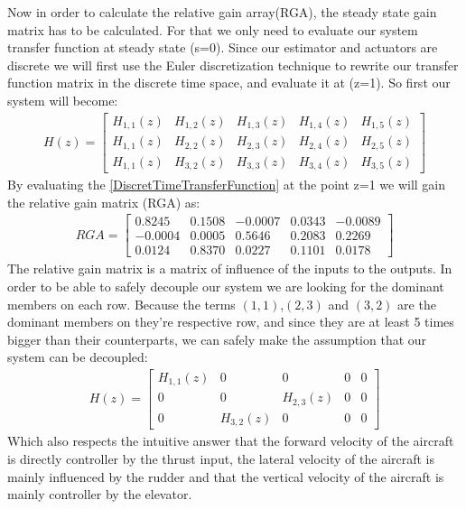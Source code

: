 \documentclass[conference]{IEEEtran}
\begin{document}
Now in order to calculate the relative gain array(RGA), the steady state gain matrix has to be calculated.
For that we only need to evaluate our system transfer function at steady state (s=0).
Since our estimator and actuators are discrete we will first use the Euler discretization technique to rewrite our transfer function matrix in the discrete time space, and evaluate it at (z=1).
So first our system will become:
\begin{align}
    H(z)=\begin{bmatrix}
             H_{1,1}(z) & H_{1,2}(z) & H_{1,3}(z) & H_{1,4}(z) & H_{1,5}(z) \\
             H_{1,1}(z) & H_{2,2}(z) & H_{2,3}(z) & H_{2,4}(z) & H_{2,5}(z) \\
             H_{1,1}(z) & H_{3,2}(z) & H_{3,3}(z) & H_{3,4}(z) & H_{3,5}(z)
         \end{bmatrix}
    \label{DiscretTimeTransferFunction}
\end{align}
By evaluating the {\ref{DiscretTimeTransferFunction}} at the point z=1 we will gain the relative gain matrix (RGA) as:
\begin{align}
    RGA=\begin{bmatrix}
            0.8245  & 0.1508 & -0.0007 & 0.0343 & -0.0089 \\
            -0.0004 & 0.0005 & 0.5646  & 0.2083 & 0.2269  \\
            0.0124  & 0.8370 & 0.0227  & 0.1101 & 0.0178
        \end{bmatrix}
\end{align}
The relative gain matrix is a matrix of influence of the inputs to the outputs.
In order to be able to safely decouple our system we are looking for the dominant members on each row.
Because the terms $(1,1)$,$(2,3)$ and $(3,2)$ are the dominant members on they're respective row, and since they are at least 5 times bigger than their counterparts, we can safely make the assumption that our system can be decoupled:
\begin{align}
    H(z)=\begin{bmatrix}
             H_{1,1}(z) & 0          & 0          & 0 & 0 \\
             0          & 0          & H_{2,3}(z) & 0 & 0 \\
             0          & H_{3,2}(z) & 0          & 0 & 0
         \end{bmatrix}
    \label{DecoupledDiscretTimeTransferFunction}
\end{align}
Which also respects the intuitive answer that the forward velocity of the aircraft is directly controller by the thrust input, the lateral velocity of the aircraft is mainly influenced by the rudder and that the vertical velocity of the aircraft is mainly controller by the elevator.
\end{document}
